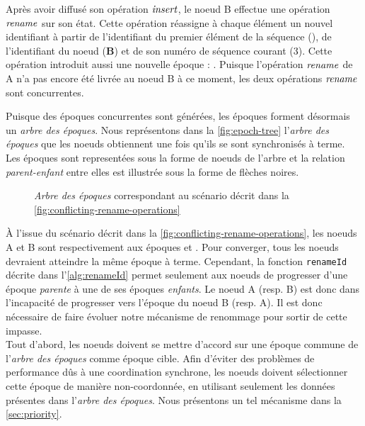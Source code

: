 Après avoir diffusé son opération $\mathit{insert}$, le noeud B effectue une opération $\mathit{rename}$ sur son état.
Cette opération réassigne à chaque élément un nouvel identifiant à partir de l'identifiant du premier élément de la séquence (), de l'identifiant du noeud (\textbf{B}) et de son numéro de séquence courant (3).
Cette opération introduit aussi une nouvelle époque : .
Puisque l'opération $\mathit{rename}$ de A n'a pas encore été livrée au noeud B à ce moment, les deux opérations $\mathit{rename}$ sont concurrentes.

Puisque des époques concurrentes sont générées, les époques forment désormais un \emph{arbre des époques}.
Nous représentons dans la \autoref{fig:epoch-tree} l'\emph{arbre des époques} que les noeuds obtiennent une fois qu'ils se sont synchronisés à terme.
Les époques sont representées sous la forme de noeuds de l'arbre et la relation \emph{parent-enfant} entre elles est illustrée sous la forme de flèches noires.

\begin{figure}[!ht]
  \centering
  \caption{\emph{Arbre des époques} correspondant au scénario décrit dans la \autoref{fig:conflicting-rename-operations}}
  \label{fig:epoch-tree}
\end{figure}

À l'issue du scénario décrit dans la \autoref{fig:conflicting-rename-operations}, les noeuds A et B sont respectivement aux époques  et .
Pour converger, tous les noeuds devraient atteindre la même époque à terme.
Cependant, la fonction \texttt{renameId} décrite dans l'\autoref{alg:renameId} permet seulement aux noeuds de progresser d'une époque \emph{parente} à une de ses époques \emph{enfants}.
Le noeud A (resp. B) est donc dans l'incapacité de progresser vers l'époque du noeud B (resp. A).
Il est donc nécessaire de faire évoluer notre mécanisme de renommage pour sortir de cette impasse.\\

Tout d'abord, les noeuds doivent se mettre d'accord sur une époque commune de l'\emph{arbre des époques} comme époque cible.
Afin d'éviter des problèmes de performance dûs à une coordination synchrone, les noeuds doivent sélectionner cette époque de manière non-coordonnée, \ie en utilisant seulement les données présentes dans l'\emph{arbre des époques}.
Nous présentons un tel mécanisme dans la \autoref{sec:priority}.

